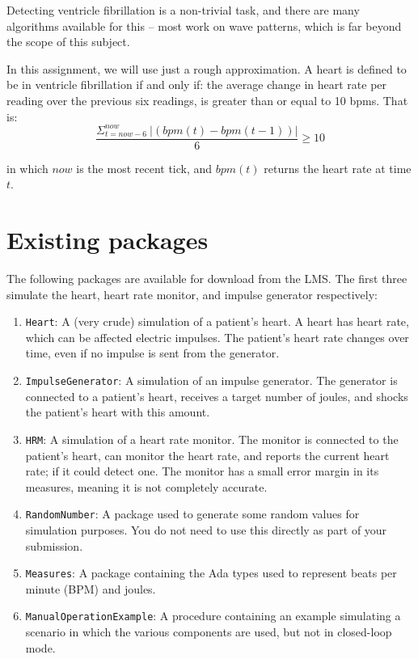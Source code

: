 \documentclass[11pt]{article}
\begin{document}
Detecting ventricle fibrillation is a non-trivial task, and there are many algorithms available for this -- most work on wave patterns, which is far beyond the scope of this subject.

In this assignment, we will use just a rough approximation. A heart is defined to be in ventricle fibrillation if and only if: the average change in heart rate per reading over the previous six readings, is greater than or equal to 10 bpms. That is:
%
\[
\frac{\Sigma_{t=now-6}^{now}\ |(bpm(t) - bpm(t-1))|} {6} \geq 10
\]


\noindent in which $now$ is the most recent tick, and $bpm(t)$ returns the heart rate at time $t$.

\section{Existing packages}
\label{sec:existing-packages}

The following packages are available for download from the LMS. 
The first three simulate the heart, heart rate monitor, and impulse generator respectively:

\begin{enumerate}

 \item \texttt{Heart}: A (very crude) simulation of a patient's heart. A heart has heart rate, which can be affected electric impulses. The patient's heart rate changes over time, even if no impulse is sent from the generator.

 \item \texttt{ImpulseGenerator}: A simulation of an impulse generator. The generator is connected to a patient's heart, receives a target number of joules, and shocks the patient's heart with this amount.

 \item \texttt{HRM}: A simulation of a heart rate monitor. The monitor is connected to the patient's heart, can monitor the heart rate, and reports the current heart rate; if it could detect one. The monitor has a small error margin in its measures, meaning it is not completely accurate.

 \item \texttt{RandomNumber}: A package used to generate some random values for simulation purposes. You do not need to use this directly as part of your submission.

 \item \texttt{Measures}: A package containing the Ada types used to represent beats per minute (BPM) and joules.

 \item \texttt{ManualOperationExample}: A procedure containing an example simulating a scenario in which the various components are used, but not in closed-loop mode.

\end{enumerate}
\end{document}
